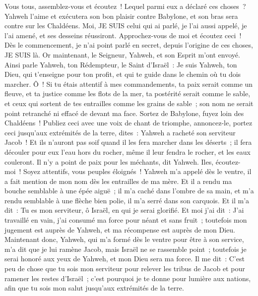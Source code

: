 \begin{multicols}{2}
Vous tous, assemblez-vous et écoutez~! Lequel parmi eux a déclaré ces choses~? Yahweh l'aime et exécutera son bon plaisir contre Babylone, et son bras sera contre sur les Chaldéens.
Moi, JE SUIS celui qui ai parlé, je l'ai aussi appelé, je l'ai amené, et ses desseins réussiront.
Approchez-vous de moi et écoutez ceci~! Dès le commencement, je n'ai point parlé en secret, depuis l'origine de ces choses, JE SUIS là. Or maintenant, le Seigneur, Yahweh, et son Esprit m'ont envoyé.
Ainsi parle Yahweh, ton Rédempteur, le Saint d'Israël~: Je suis Yahweh, ton Dieu, qui t'enseigne pour ton profit, et qui te guide dans le chemin où tu dois marcher.
Ô~! Si tu étais attentif à mes commandements, ta paix serait comme un fleuve, et ta justice comme les flots de la mer,
ta postérité serait comme le sable, et ceux qui sortent de tes entrailles comme les grains de sable~; son nom ne serait point retranché ni effacé de devant ma face.
Sortez de Babylone, fuyez loin des Chaldéens~! Publiez ceci avec une voix de chant de triomphe, annoncez-le, portez ceci jusqu'aux extrémités de la terre, dites~: Yahweh a racheté son serviteur Jacob~!
Et ils n'auront pas soif quand il les fera marcher dans les déserts~; il fera découler pour eux l'eau hors du rocher, même il leur fendra le rocher, et les eaux couleront.
Il n'y a point de paix pour les méchants, dit Yahweh.
\VerseOne{}Iles, écoutez-moi~! Soyez attentifs, vous peuples éloignés~! Yahweh m'a appelé dès le ventre, il a fait mention de mon nom dès les entrailles de ma mère.
Et il a rendu ma bouche semblable à une épée aiguë~; il m'a caché dans l'ombre de sa main, et m'a rendu semblable à une flèche bien polie, il m'a serré dans son carquois.
Et il m'a dit~: Tu es mon serviteur, ô Israël, en qui je serai glorifié.
Et moi j'ai dit~: J'ai travaillé en vain, j'ai consumé ma force pour néant et sans fruit~; toutefois mon jugement est auprès de Yahweh, et ma récompense est auprès de mon Dieu.
Maintenant donc, Yahweh, qui m'a formé dès le ventre pour être à son service, m'a dit que je lui ramène Jacob, mais Israël ne se rassemble point~; toutefois je serai honoré aux yeux de Yahweh, et mon Dieu sera ma force.
Il me dit~: C'est peu de chose que tu sois mon serviteur pour relever les tribus de Jacob et pour ramener les restes d'Israël~; c'est pourquoi je te donne pour lumière aux nations, afin que tu sois mon salut jusqu'aux extrémités de la terre.

\end{multicols}
